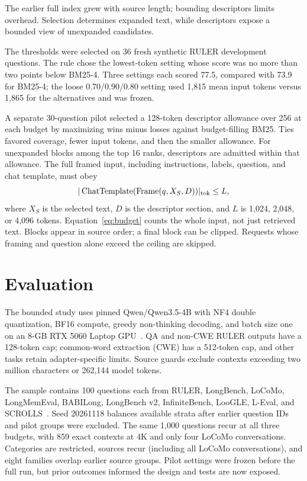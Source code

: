 \documentclass[pdflatex,sn-mathphys-num]{sn-jnl}
\begin{document}
The earlier full index grew with source length; bounding descriptors limits overhead. Selection determines expanded text, while descriptors expose a bounded view of unexpanded candidates.

The thresholds were selected on 36 fresh synthetic RULER development questions. The rule chose the lowest-token setting whose score was no more than two points below BM25-4. Three settings each scored 77.5, compared with 73.9 for BM25-4; the loose 0.70/0.90/0.80 setting used 1,815 mean input tokens versus 1,865 for the alternatives and was frozen.

A separate 30-question pilot selected a 128-token descriptor allowance over 256 at each budget by maximizing wins minus losses against budget-filling BM25. Ties favored coverage, fewer input tokens, and then the smaller allowance. For unexpanded blocks among the top 16 ranks, descriptors are admitted within that allowance. The full framed input, including instructions, labels, question, and chat template, must obey
\begin{equation}\label{eq:budget}
|\operatorname{ChatTemplate}(\operatorname{Frame}(q,X_S,D))|_{\rm tok}\leq L,
\end{equation}
where $X_S$ is the selected text, $D$ is the descriptor section, and $L$ is 1,024, 2,048, or 4,096 tokens. Equation~\eqref{eq:budget} counts the whole input, not just retrieved text. Blocks appear in source order; a final block can be clipped. Requests whose framing and question alone exceed the ceiling are skipped.
\section{Evaluation}
The bounded study uses pinned Qwen/Qwen3.5-4B with NF4 double quantization, BF16 compute, greedy non-thinking decoding, and batch size one on an 8-GB RTX 5060 Laptop GPU~\cite{dettmers2023qlora}. QA and non-CWE RULER outputs have a 128-token cap; common-word extraction (CWE) has a 512-token cap, and other tasks retain adapter-specific limits. Source guards exclude contexts exceeding two million characters or 262,144 model tokens.

The sample contains 100 questions each from RULER, LongBench, LoCoMo, LongMemEval, BABILong, LongBench v2, InfiniteBench, LooGLE, L-Eval, and SCROLLS~\cite{hsieh2024ruler,bai2024longbench,maharana2024locomo,wu2024longmemeval,kuratov2024babilong,bai2024longbenchv2,zhang2024infinitebench,li2024loogle,an2024leval,shaham2022scrolls}. Seed 20261118 balances available strata after earlier question IDs and pilot groups were excluded. The same 1,000 questions recur at all three budgets, with 859 exact contexts at 4K and only four LoCoMo conversations. Categories are restricted, sources recur (including all LoCoMo conversations), and eight families overlap earlier source groups. Pilot settings were frozen before the full run, but prior outcomes informed the design and tests are now exposed.
\end{document}
